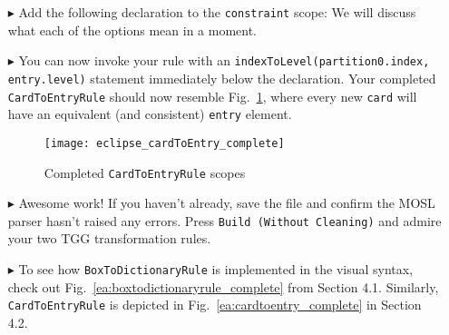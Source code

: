 \begin{itemize}

\item[$\blacktriangleright$] Add the following declaration to the \texttt{constraint} scope:  We will discuss what
each of the options mean in a moment.

\vspace{0.5cm}

\item[$\blacktriangleright$] You can now invoke your rule with an \texttt{indexToLevel(partition0.\-in\-dex, entry.level)} statement immediately below the
declaration. Your completed \texttt{CardToEntryRule} should now resemble Fig.~\ref{eclipse:c2eDone}, where every new \texttt{card} will have an equivalent
(and consistent) \texttt{entry} element.

\begin{figure}[htbp]
\begin{center}
  \texttt{[image: eclipse\_cardToEntry\_complete]}
  \caption{Completed \texttt{CardToEntryRule} scopes}
  \label{eclipse:c2eDone}
\end{center}
\end{figure}

\vspace{0.5cm}

\item[$\blacktriangleright$] Awesome work! If you haven't already, save the file and confirm the MOSL parser hasn't raised any errors. Press \texttt{Build
(Without Cleaning)} and admire your two TGG transformation rules. 

\vspace{0.5cm}

\item[$\blacktriangleright$] To see how \texttt{BoxToDictionaryRule} is implemented in the visual syntax, check out Fig.~\ref{ea:boxtodictionaryrule_complete}
from Section 4.1. Similarly, \texttt{CardToEntryRule} is depicted in Fig.~\ref{ea:cardtoentry_complete} in Section 4.2.

\end{itemize}
